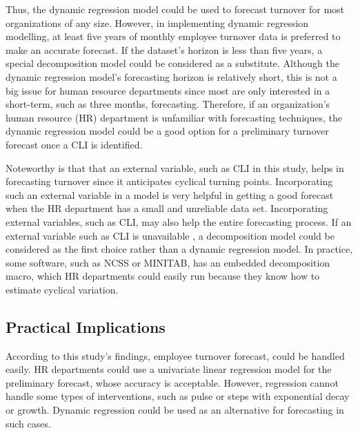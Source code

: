 Thus, the dynamic regression model could be used to forecast turnover for most organizations of any size. However, in implementing dynamic regression modelling, at least five years of monthly employee turnover data is preferred to make an accurate forecast. If the dataset's horizon is less than five years, a special decomposition model \citep{ittig1997} could be considered as a substitute. Although the dynamic regression model's forecasting horizon is relatively short, this is not a big issue for human resource departments since most are only interested in a short-term, such as three months, forecasting. Therefore, if an organization's human resource (HR) department is unfamiliar  with forecasting techniques, the dynamic regression model could be a good option for a preliminary turnover forecast once a CLI is identified. 

Noteworthy is that that an external variable, such as CLI in this study, helps in forecasting turnover since it anticipates cyclical turning points. Incorporating such an external variable in a model is very helpful in getting a good forecast when the HR department has a small and unreliable data set. Incorporating external variables, such as CLI, may also help the entire forecasting process. If an external variable such as CLI is unavailable , a decomposition model could be considered as the first choice rather than a dynamic regression model. In practice, some software, such as NCSS or MINITAB, has an embedded decomposition macro, which HR departments could easily run because they know how to estimate cyclical variation.
\subsection{Practical Implications}
According to this study's findings, employee turnover forecast, could be handled easily. HR departments could use a univariate linear regression model for the preliminary forecast, whose accuracy is acceptable. However, regression cannot handle some types of interventions, such as pulse or steps with exponential decay or growth. Dynamic regression could   be used as an alternative for forecasting in such cases.


